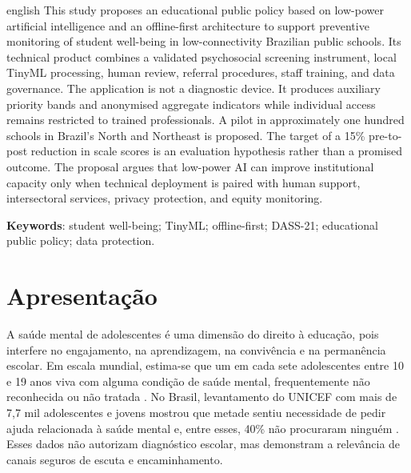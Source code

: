 \documentclass[
  12pt,
  openright,
  oneside,
  a4paper,
  english,
  brazil
]{abntex2}
\begin{document}
\begin{resumo}[Abstract]
\begin{otherlanguage*}{english}
This study proposes an educational public policy based on low-power artificial
intelligence and an offline-first architecture to support preventive monitoring
of student well-being in low-connectivity Brazilian public schools. Its
technical product combines a validated psychosocial screening instrument, local
TinyML processing, human review, referral procedures, staff training, and data
governance. The application is not a diagnostic device. It produces auxiliary
priority bands and anonymised aggregate indicators while individual access
remains restricted to trained professionals. A pilot in approximately one
hundred schools in Brazil's North and Northeast is proposed. The target of a
15\% pre-to-post reduction in scale scores is an evaluation hypothesis rather
than a promised outcome. The proposal argues that low-power AI can improve
institutional capacity only when technical deployment is paired with human
support, intersectoral services, privacy protection, and equity monitoring.

\vspace{\onelineskip}
\noindent
\textbf{Keywords}: student well-being; TinyML; offline-first; DASS-21;
educational public policy; data protection.
\end{otherlanguage*}
\end{resumo}

\tableofcontents*
\cleardoublepage

\textual

\chapter{Apresentação}

A saúde mental de adolescentes é uma dimensão do direito à educação, pois
interfere no engajamento, na aprendizagem, na convivência e na permanência
escolar. Em escala mundial, estima-se que um em cada sete adolescentes entre 10
e 19 anos viva com alguma condição de saúde mental, frequentemente não
reconhecida ou não tratada \cite{who2025}. No Brasil, levantamento do UNICEF com
mais de 7,7 mil adolescentes e jovens mostrou que metade sentiu necessidade de
pedir ajuda relacionada à saúde mental e, entre esses, 40\% não procuraram
ninguém \cite{unicef2022ajuda}. Esses dados não autorizam diagnóstico escolar,
mas demonstram a relevância de canais seguros de escuta e encaminhamento.
\end{document}
